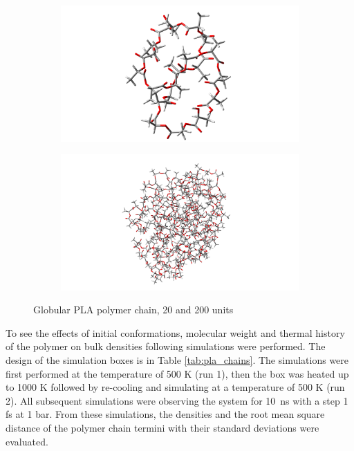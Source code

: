 \begin{figure}[htb]
	\begin{subfigure}{0.5\textwidth}
		\includegraphics[width=0.9\linewidth]{img/pla_10g_tube.png} 
	\end{subfigure}
	\begin{subfigure}{0.5\textwidth}
		\includegraphics[width=0.9\linewidth]{img/pla_100g_tube.png} 
	\end{subfigure}   	
	\caption{Globular PLA polymer chain, 20 and 200 units}
	\label{fig:sbalene}
\end{figure}

To see the effects of initial conformations, molecular weight and thermal history of the polymer on bulk densities following simulations were performed. The design of the simulation boxes is in Table \ref{tab:pla_chains}. The simulations were first performed at the temperature of 500 K (run 1), then the box was heated up to 1000 K followed by re-cooling and simulating at a temperature of 500 K (run 2). All subsequent simulations were observing the system for 10~ns with a step 1 fs at 1 bar. From these simulations, the densities and the root mean square distance of the polymer chain termini with their standard deviations were evaluated.

